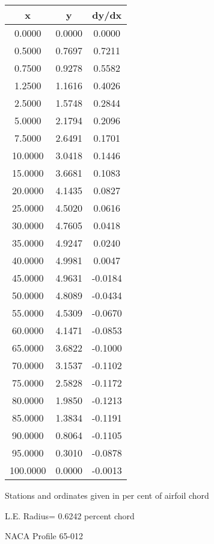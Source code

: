 \documentclass[11pt]{book}
\begin{document}
 \vspace{8mm}
 \begin{tabular}{|c|c|c|} \hline 
  x  &  y  &  dy/dx \\
 \hline
0.0000 & 0.0000 & 0.0000 \\
0.5000 & 0.7697 & 0.7211 \\
0.7500 & 0.9278 & 0.5582 \\
1.2500 & 1.1616 & 0.4026 \\
2.5000 & 1.5748 & 0.2844 \\
5.0000 & 2.1794 & 0.2096 \\
7.5000 & 2.6491 & 0.1701 \\
10.0000 & 3.0418 & 0.1446 \\
15.0000 & 3.6681 & 0.1083 \\
20.0000 & 4.1435 & 0.0827 \\
25.0000 & 4.5020 & 0.0616 \\
30.0000 & 4.7605 & 0.0418 \\
35.0000 & 4.9247 & 0.0240 \\
40.0000 & 4.9981 & 0.0047 \\
45.0000 & 4.9631 & -0.0184 \\
50.0000 & 4.8089 & -0.0434 \\
55.0000 & 4.5309 & -0.0670 \\
60.0000 & 4.1471 & -0.0853 \\
65.0000 & 3.6822 & -0.1000 \\
70.0000 & 3.1537 & -0.1102 \\
75.0000 & 2.5828 & -0.1172 \\
80.0000 & 1.9850 & -0.1213 \\
85.0000 & 1.3834 & -0.1191 \\
90.0000 & 0.8064 & -0.1105 \\
95.0000 & 0.3010 & -0.0878 \\
100.0000 & 0.0000 & -0.0013 \\
 \hline
 \end{tabular}
 \vspace{8mm}


Stations and ordinates given in per cent of airfoil chord 


L.E. Radius=  0.6242 percent chord
 \newpage
  \label{p65-012}
 \begin{Large}
 NACA Profile 65-012
 \end{Large}
  
\end{document}
